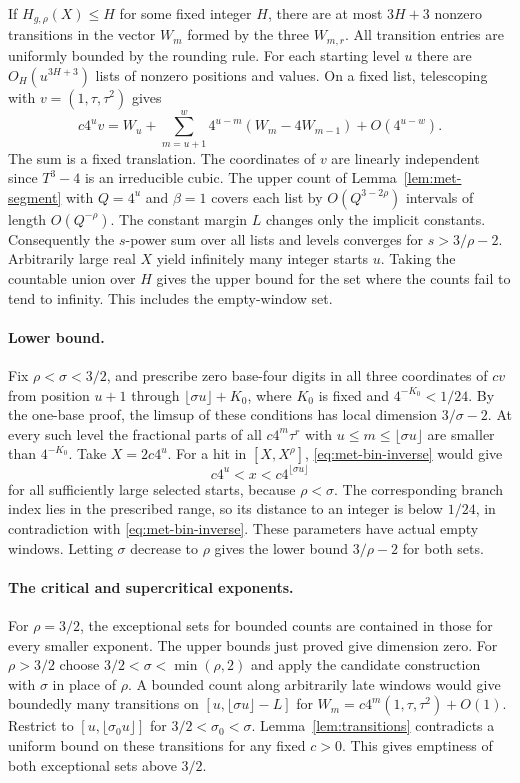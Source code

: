 \documentclass[11pt,reqno,a4paper]{amsart}
\theoremstyle{remark}
\begin{document}
If \(H_{g,\rho}(X)\leq H\) for some fixed integer \(H\), there are
at most \(3H+3\) nonzero transitions in the vector \(W_m\) formed
by the three \(W_{m,r}\). All transition entries are uniformly
bounded by the rounding rule. For each starting level \(u\)
there are \(O_H(u^{3H+3})\) lists of nonzero positions and
values. On a fixed list, telescoping with \(v=(1,\tau,\tau^2)\)
gives
\[
 c4^u v=W_u+
   \sum_{m=u+1}^{w}4^{u-m}(W_m-4W_{m-1})+O(4^{u-w}).
\]
The sum is a fixed translation. The coordinates of \(v\) are
linearly independent since \(T^3-4\) is an irreducible cubic.
The upper count of Lemma~\ref{lem:met-segment} with \(Q=4^u\)
and \(\beta=1\) covers each list by \(O(Q^{3-2\rho})\) intervals
of length \(O(Q^{-\rho})\). The constant margin \(L\) changes
only the implicit constants. Consequently the \(s\)-power sum
over all lists and levels converges for \(s>3/\rho-2\).
Arbitrarily large real \(X\) yield infinitely many integer
starts \(u\). Taking the countable union over \(H\) gives the
upper bound for the set where the counts fail to tend to
infinity. This includes the empty-window set.

\paragraph{Lower bound.}
Fix \(\rho<\sigma<3/2\), and prescribe zero base-four digits in
all three coordinates of \(cv\) from position \(u+1\) through
\(\lfloor\sigma u\rfloor+K_0\), where \(K_0\) is fixed and
\(4^{-K_0}<1/24\). By the one-base proof, the limsup of these
conditions has local dimension \(3/\sigma-2\). At every such
level the fractional parts of all \(c4^m\tau^r\) with
\(u\leq m\leq\lfloor\sigma u\rfloor\) are smaller than
\(4^{-K_0}\). Take \(X=2c4^u\). For a hit in \([X,X^\rho]\),
\eqref{eq:met-bin-inverse} would give
\[
 c4^u < x < c4^{\lfloor\sigma u\rfloor}
\]
for all sufficiently large selected starts, because
\(\rho<\sigma\). The corresponding branch index lies in the
prescribed range, so its distance to an integer is below
\(1/24\), in contradiction with \eqref{eq:met-bin-inverse}.
These parameters have actual empty windows. Letting
\(\sigma\) decrease to \(\rho\) gives the lower bound
\(3/\rho-2\) for both sets.

\paragraph{The critical and supercritical exponents.}
For \(\rho=3/2\), the exceptional sets for bounded counts are
contained in those for every smaller exponent. The upper bounds
just proved give dimension zero. For \(\rho>3/2\) choose
\(3/2<\sigma<\min(\rho,2)\) and apply the candidate construction
with \(\sigma\) in place of \(\rho\). A bounded count along
arbitrarily late windows would give boundedly many transitions
on \([u,\lfloor\sigma u\rfloor-L]\) for
\(W_m=c4^m(1,\tau,\tau^2)+O(1)\). Restrict to
\([u,\lfloor\sigma_0u\rfloor]\) for \(3/2<\sigma_0<\sigma\).
Lemma~\ref{lem:transitions} contradicts a uniform bound on these
transitions for any fixed \(c>0\). This gives emptiness of both
exceptional sets above \(3/2\).
\end{document}

